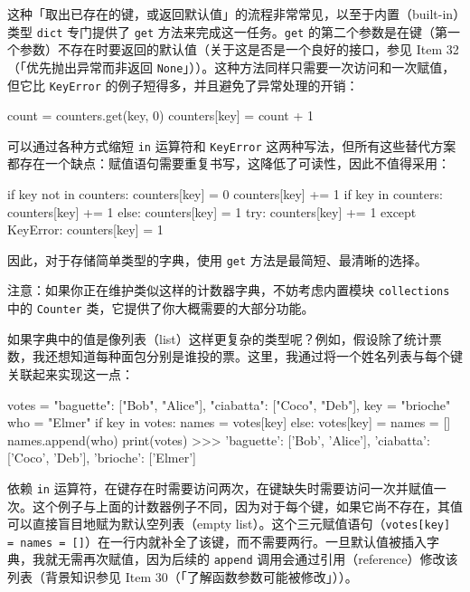 这种「取出已存在的键，或返回默认值」的流程非常常见，以至于内置（built-in）类型 \texttt{dict} 专门提供了 \texttt{get} 方法来完成这一任务。\texttt{get} 的第二个参数是在键（第一个参数）不存在时要返回的默认值（关于这是否是一个良好的接口，参见 Item 32（「优先抛出异常而非返回 \texttt{None}」））。这种方法同样只需要一次访问和一次赋值，但它比 \texttt{KeyError} 的例子短得多，并且避免了异常处理的开销：

\begin{codebox}[python]
count = counters.get(key, 0)
counters[key] = count + 1
\end{codebox}

可以通过各种方式缩短 \texttt{in} 运算符和 \texttt{KeyError} 这两种写法，但所有这些替代方案都存在一个缺点：赋值语句需要重复书写，这降低了可读性，因此不值得采用：

\begin{codebox}[python]
if key not in counters:
    counters[key] = 0
counters[key] += 1
if key in counters:
    counters[key] += 1
else:
    counters[key] = 1
try:
    counters[key] += 1
except KeyError:
    counters[key] = 1
\end{codebox}

因此，对于存储简单类型的字典，使用 \texttt{get} 方法是最简短、最清晰的选择。

注意：如果你正在维护类似这样的计数器字典，不妨考虑内置模块 \texttt{collections} 中的 \texttt{Counter} 类，它提供了你大概需要的大部分功能。

如果字典中的值是像列表（list）这样更复杂的类型呢？例如，假设除了统计票数，我还想知道每种面包分别是谁投的票。这里，我通过将一个姓名列表与每个键关联起来实现这一点：

\begin{codebox}[python]
votes = {
    "baguette": ["Bob", "Alice"],
    "ciabatta": ["Coco", "Deb"],
}
key = "brioche"
who = "Elmer"
if key in votes:
    names = votes[key]
else:
    votes[key] = names = []
names.append(who)
print(votes)
>>>
{'baguette': ['Bob', 'Alice'],
 'ciabatta': ['Coco', 'Deb'],
 'brioche': ['Elmer']}
\end{codebox}

依赖 \texttt{in} 运算符，在键存在时需要访问两次，在键缺失时需要访问一次并赋值一次。这个例子与上面的计数器例子不同，因为对于每个键，如果它尚不存在，其值可以直接盲目地赋为默认空列表（empty list）。这个三元赋值语句（\texttt{votes[key] = names = []}）在一行内就补全了该键，而不需要两行。一旦默认值被插入字典，我就无需再次赋值，因为后续的 \texttt{append} 调用会通过引用（reference）修改该列表（背景知识参见 Item 30（「了解函数参数可能被修改」））。

